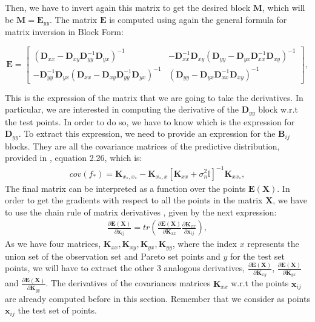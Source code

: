 Then, we have to invert again this matrix to get the desired block $\mathbf{M}$, which will be $\mathbf{M} = \mathbf{E}_{yy}$. The matrix $\mathbf{E}$ is computed using again the general formula for matrix inversion in Block Form:

\[
\mathbf{E}=
\left[
\begin{array}{c|c}
(\mathbf{D}_{xx}-\mathbf{D}_{xy}\mathbf{D}_{yy}^{-1}\mathbf{D}_{yx})^{-1} & -\mathbf{D}_{xx}^{-1}\mathbf{D}_{xy}(\mathbf{D}_{yy}-\mathbf{D}_{yx}\mathbf{D}_{xx}^{-1}\mathbf{D}_{xy})^{-1}\\
\hline
-\mathbf{D}_{yy}^{-1}\mathbf{D}_{yx}(\mathbf{D}_{xx}-\mathbf{D}_{xy}\mathbf{D}_{yy}^{-1}\mathbf{D}_{yx})^{-1} & (\mathbf{D}_{yy}-\mathbf{D}_{yx}\mathbf{D}_{xx}^{-1}\mathbf{D}_{xy})^{-1}
\end{array}
\right],
\]

This is the expression of the matrix that we are going to take the derivatives. In particular, we are interested in computing the derivative of the $\mathbf{D}_{yy}$ block w.r.t the test points. In order to do so, we have to know which is the expression for $\mathbf{D}_{yy}$. To extract this expression, we need to provide an expression for the $\mathbf{B}_{ij}$ blocks. They are all the covariance matrices of the predictive distribution, provided in \cite{rasmussen2003gaussian}, equation 2.26, which is:
\begin{align}
cov(f_*) = \mathbf{K}_{x_*,x_*} - \mathbf{K}_{x_*,x}[\mathbf{K}_{xx}+\sigma_n^2\mathbb{I}]^{-1}\mathbf{K}_{xx_*},
\end{align}
The final matrix can be interpreted as a function over the points $\mathbf{E}(\mathbf{X})$. In order to get the gradients with respect to all the points in the matrix $\mathbf{X}$, we have to use the chain rule of matrix derivatives \cite{petersen2012}, 
given by the next expression:
\begin{align}
\frac{\partial \mathbf{E}(\mathbf{X})}{\partial \mathbf{x}_{ij}} = tr(\frac{\partial \mathbf{E}(\mathbf{X})}{\partial \mathbf{K}_{xx}} \frac{\partial \mathbf{K}_{xx}}{\partial \mathbf{x}_{ij}}),
\end{align}
As we have four matrices, $\mathbf{K}_{xx}, \mathbf{K}_{xy}, \mathbf{K}_{yx}, \mathbf{K}_{yy}$, where the index $x$ represents the union set of the observation set and Pareto set points and $y$ for the test set points, we will have to extract the other 3 analogous derivatives, $\frac{\partial \mathbf{E}(\mathbf{X})}{\partial \mathbf{K}_{xy}}$, $\frac{\partial \mathbf{E}(\mathbf{X})}{\partial \mathbf{K}_{yx}}$ and $\frac{\partial \mathbf{E}(\mathbf{X})}{\partial \mathbf{K}_{yy}}$. The derivatives of the covariances matrices $\mathbf{K}_{xx}$ w.r.t the points $\mathbf{x}_{ij}$ are already computed before in this section. Remember that we consider as points $\mathbf{x}_{ij}$ the test set of points.

